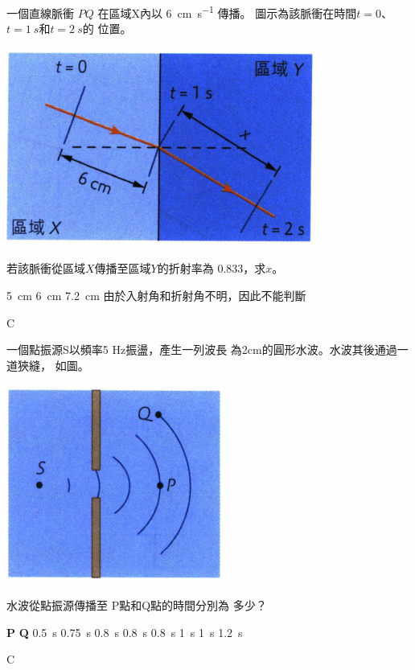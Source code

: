 {
    一個直線脈衝 $PQ$ 在區域X內以 \qty{6}{cm.s^{-1}} 傳播。 圖示為該脈衝在時間$t=0$、$t=\qty{1}{s}$和$t=\qty{2}{s}$的 位置。
    \par{\par\centering\includegraphics[width=.35\textwidth]{./img/ch2_earlyclass_wave_mc_2024-05-13-21-01-10.png}\par}
    若該脈衝從區域$X$傳播至區域$Y$的折射率為 0.833，求$x$。
    \begin{tasks}
        \task \qty{5}{cm}
        \task \qty{6}{cm}
        \task \qty{7.2}{cm}
        \task 由於入射角和折射角不明，因此不能判斷
    \end{tasks}
}{\mckey C}

{
    一個點振源S以頻率5 Hz振盪，產生一列波長 為2cm的圓形水波。水波其後通過一道狹縫， 如圖。
    \par{\par\centering\includegraphics[width=.3\textwidth]{./img/ch2_earlyclass_wave_mc_2024-05-13-21-09-07.png}\par}
    水波從點振源傳播至 P點和Q點的時間分別為 多少？
    \begin{tasks}
        \task [] \textbf{P} \tab\tab \textbf{Q}
        \task \qty{0.5}{s} \tab\tab \qty{0.75}{s}
        \task \qty{0.8}{s} \tab\tab \qty{0.8}{s}
        \task \qty{0.8}{s} \tab\tab \qty{1}{s}
        \task \qty{1}{s} \tab\tab \qty{1.2}{s}
    \end{tasks}

}{\mckey C}


